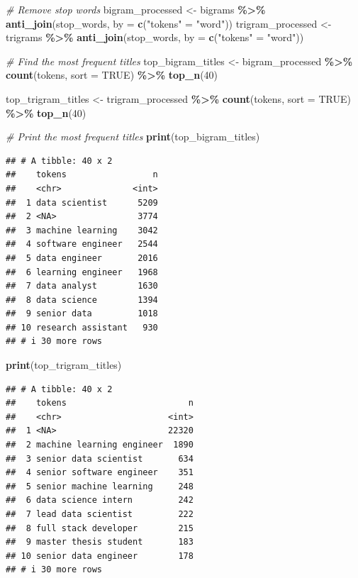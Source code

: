 \documentclass[11pt,]{article}
\newenvironment{Shaded}{\begin{snugshade}}{\end{snugshade}}
\newcommand{\AttributeTok}[1]{\textcolor[rgb]{0.13,0.29,0.53}{#1}}
\newcommand{\CommentTok}[1]{\textcolor[rgb]{0.56,0.35,0.01}{\textit{#1}}}
\newcommand{\ConstantTok}[1]{\textcolor[rgb]{0.56,0.35,0.01}{#1}}
\newcommand{\DecValTok}[1]{\textcolor[rgb]{0.00,0.00,0.81}{#1}}
\newcommand{\FunctionTok}[1]{\textcolor[rgb]{0.13,0.29,0.53}{\textbf{#1}}}
\newcommand{\NormalTok}[1]{#1}
\newcommand{\OtherTok}[1]{\textcolor[rgb]{0.56,0.35,0.01}{#1}}
\newcommand{\SpecialCharTok}[1]{\textcolor[rgb]{0.81,0.36,0.00}{\textbf{#1}}}
\newcommand{\StringTok}[1]{\textcolor[rgb]{0.31,0.60,0.02}{#1}}
\begin{document}
\begin{Shaded}
\begin{Highlighting}[]
\CommentTok{\# Remove stop words}
\NormalTok{bigram\_processed }\OtherTok{\textless{}{-}}\NormalTok{ bigrams }\SpecialCharTok{\%\textgreater{}\%}
  \FunctionTok{anti\_join}\NormalTok{(stop\_words, }\AttributeTok{by =} \FunctionTok{c}\NormalTok{(}\StringTok{"tokens"} \OtherTok{=} \StringTok{"word"}\NormalTok{))}
\NormalTok{trigram\_processed }\OtherTok{\textless{}{-}}\NormalTok{ trigrams }\SpecialCharTok{\%\textgreater{}\%}
  \FunctionTok{anti\_join}\NormalTok{(stop\_words, }\AttributeTok{by =} \FunctionTok{c}\NormalTok{(}\StringTok{"tokens"} \OtherTok{=} \StringTok{"word"}\NormalTok{))}

\CommentTok{\# Find the most frequent titles}
\NormalTok{top\_bigram\_titles }\OtherTok{\textless{}{-}}\NormalTok{ bigram\_processed }\SpecialCharTok{\%\textgreater{}\%}
  \FunctionTok{count}\NormalTok{(tokens, }\AttributeTok{sort =} \ConstantTok{TRUE}\NormalTok{) }\SpecialCharTok{\%\textgreater{}\%}
  \FunctionTok{top\_n}\NormalTok{(}\DecValTok{40}\NormalTok{)}

\NormalTok{top\_trigram\_titles }\OtherTok{\textless{}{-}}\NormalTok{ trigram\_processed }\SpecialCharTok{\%\textgreater{}\%}
  \FunctionTok{count}\NormalTok{(tokens, }\AttributeTok{sort =} \ConstantTok{TRUE}\NormalTok{) }\SpecialCharTok{\%\textgreater{}\%}
  \FunctionTok{top\_n}\NormalTok{(}\DecValTok{40}\NormalTok{)}

\CommentTok{\# Print the most frequent titles}
\FunctionTok{print}\NormalTok{(top\_bigram\_titles)}
\end{Highlighting}
\end{Shaded}

\begin{verbatim}
## # A tibble: 40 x 2
##    tokens                 n
##    <chr>              <int>
##  1 data scientist      5209
##  2 <NA>                3774
##  3 machine learning    3042
##  4 software engineer   2544
##  5 data engineer       2016
##  6 learning engineer   1968
##  7 data analyst        1630
##  8 data science        1394
##  9 senior data         1018
## 10 research assistant   930
## # i 30 more rows
\end{verbatim}

\begin{Shaded}
\begin{Highlighting}[]
\FunctionTok{print}\NormalTok{(top\_trigram\_titles)}
\end{Highlighting}
\end{Shaded}

\begin{verbatim}
## # A tibble: 40 x 2
##    tokens                        n
##    <chr>                     <int>
##  1 <NA>                      22320
##  2 machine learning engineer  1890
##  3 senior data scientist       634
##  4 senior software engineer    351
##  5 senior machine learning     248
##  6 data science intern         242
##  7 lead data scientist         222
##  8 full stack developer        215
##  9 master thesis student       183
## 10 senior data engineer        178
## # i 30 more rows
\end{verbatim}
\end{document}
